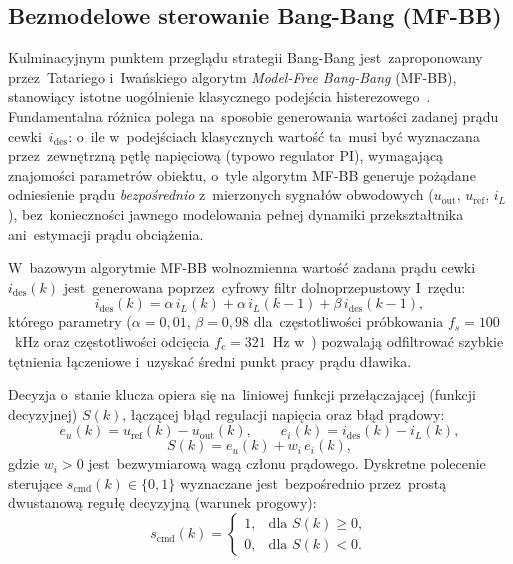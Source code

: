 \subsection{Bezmodelowe sterowanie Bang-Bang (MF-BB)}
\label{subsec:mfbb}

Kulminacyjnym punktem przeglądu strategii Bang-Bang jest~zaproponowany przez~Tatariego i~Iwańskiego algorytm \emph{Model-Free Bang-Bang} (MF-BB), stanowiący istotne uogólnienie klasycznego podejścia histerezowego~\cite{tatari2024mfbb}. Fundamentalna różnica polega na~sposobie generowania wartości zadanej prądu cewki~$i_{\mathrm{des}}$: o~ile w~podejściach klasycznych wartość ta~musi być wyznaczana przez~zewnętrzną pętlę napięciową (typowo regulator PI), wymagającą znajomości parametrów obiektu, o~tyle algorytm MF-BB generuje pożądane odniesienie prądu \emph{bezpośrednio} z~mierzonych sygnałów obwodowych ($u_{\mathrm{out}}$, $u_{\mathrm{ref}}$, $i_L$), bez~konieczności jawnego modelowania pełnej dynamiki przekształtnika ani~estymacji prądu obciążenia.

W~bazowym algorytmie MF-BB wolnozmienna wartość zadana prądu cewki~$i_{\mathrm{des}}(k)$ jest~generowana poprzez~cyfrowy filtr dolnoprzepustowy I~rzędu:
\begin{equation}
    i_{\mathrm{des}}(k) = \alpha\,i_L(k) + \alpha\,i_L(k-1) + \beta\,i_{\mathrm{des}}(k-1),
    \label{eq:mfbb-ides}
\end{equation}
którego parametry ($\alpha = 0{,}01$, $\beta = 0{,}98$ dla~częstotliwości próbkowania $f_s = 100$~kHz oraz częstotliwości odcięcia $f_c = 321$~Hz w~\cite{tatari2024mfbb}) pozwalają odfiltrować szybkie tętnienia łączeniowe i~uzyskać średni punkt pracy prądu dławika.

Decyzja o~stanie klucza opiera się na~liniowej funkcji przełączającej (funkcji decyzyjnej) $S(k)$, łączącej błąd regulacji napięcia oraz błąd prądowy:
\begin{equation}
    e_u(k) = u_{\mathrm{ref}}(k) - u_{\mathrm{out}}(k), \qquad e_i(k) = i_{\mathrm{des}}(k) - i_L(k),
    \label{eq:mfbb-errors}
\end{equation}
\begin{equation}
    S(k) = e_u(k) + w_i\,e_i(k),
    \label{eq:mfbb-surface}
\end{equation}
gdzie $w_i > 0$ jest~bezwymiarową wagą członu prądowego. Dyskretne polecenie sterujące $s_{\mathrm{cmd}}(k)\in\{0,1\}$ wyznaczane jest~bezpośrednio przez~prostą dwustanową regułę decyzyjną (warunek progowy):
\begin{equation}
    s_{\mathrm{cmd}}(k) =
    \begin{cases}
        1, & \text{dla } S(k) \ge 0, \\
        0, & \text{dla } S(k) < 0.
    \end{cases}
    \label{eq:mfbb-comparator}
\end{equation}

